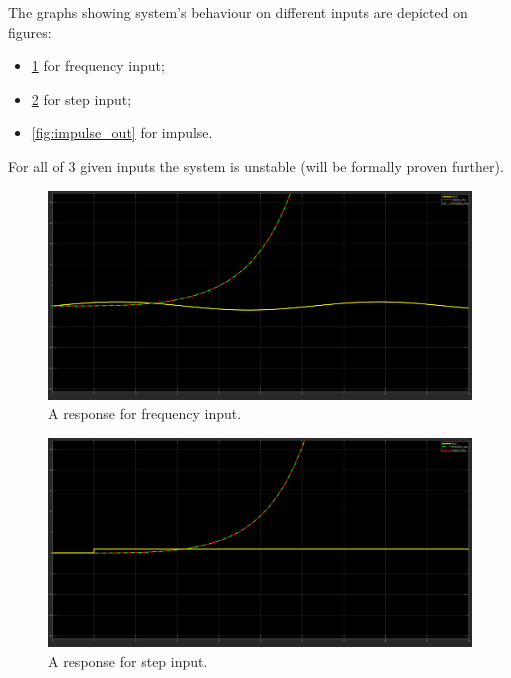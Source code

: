\documentclass[12pt,letterpaper]{article}
\begin{document}
\begin{enumerate}[leftmargin=!,labelindent=5pt]
    The graphs showing system's behaviour on different inputs are depicted on figures: 
    \begin{itemize}
        \item \ref{fig:sin_out} for frequency input;
        \item \ref{fig:step_out} for step input;
        \item \ref{fig:impulse_out} for impulse.
    \end{itemize}
    For all of 3 given inputs the system is unstable (will be formally proven further).

        
    \begin{figure}[H]
        \centering
        \includegraphics[width=15cm]{images/output/sin_out.png}
        \caption{A response for frequency input.}
        \label{fig:sin_out}
    \end{figure}
    
    \begin{figure}[H]
        \centering
        \includegraphics[width=15cm]{images/output/step_out.png}
        \caption{A response for step input.}
        \label{fig:step_out}
    \end{figure}
    

\end{enumerate}
\end{document}
